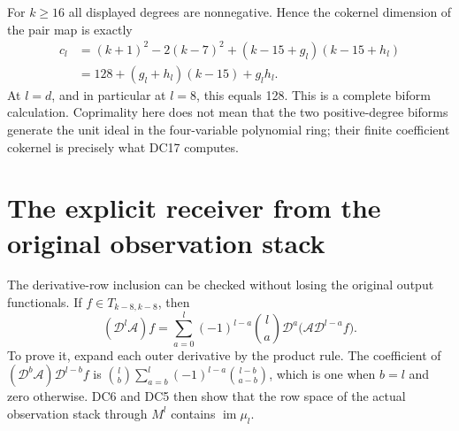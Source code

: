 \documentclass[11pt]{article}
\newcommand{\im}{\operatorname{im}}
\begin{document}
For $k\ge16$ all displayed degrees are nonnegative.  Hence the
cokernel dimension of the pair map is exactly
\[
 \begin{split}
 c_l&=(k+1)^2-2(k-7)^2
             +(k-15+g_l)(k-15+h_l)\\
    &=128+(g_l+h_l)(k-15)+g_lh_l.                                \end{split}\tag{DC17}
\]
At $l=d$, and in particular at $l=8$, this equals 128.  This is a
complete biform calculation.  Coprimality here does not mean that
the two positive-degree biforms generate the unit ideal in the
four-variable polynomial ring; their finite coefficient cokernel
is precisely what DC17 computes.

\section{The explicit receiver from the original observation stack}
The derivative-row inclusion can be checked without losing the
original output functionals.  If $f\in T_{k-8,k-8}$, then
\[
 (\mathcal D^l\mathcal A)f
  =\sum_{a=0}^l(-1)^{l-a}\binom la
      \mathcal D^a\bigl(\mathcal A\mathcal D^{l-a}f\bigr).
                                                                    \tag{DC18}
\]
To prove it, expand each outer derivative by the product rule.  The
coefficient of $(\mathcal D^b\mathcal A)\mathcal D^{l-b}f$ is
$\binom lb\sum_{a=b}^l(-1)^{l-a}\binom{l-b}{a-b}$, which is one
when $b=l$ and zero otherwise.  DC6 and DC5 then show that the row
space of the actual observation stack through $M^l$ contains
$\im\mu_l$.
\end{document}
